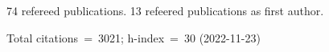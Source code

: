 74 refereed publications. 13 refeered publications as first author.

Total citations~=~3021; h-index~=~30 (2022-11-23)